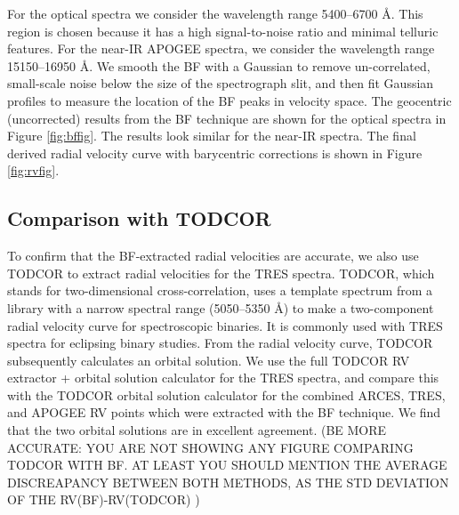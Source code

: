 For the optical spectra we consider the wavelength range 5400--6700 \AA. This region is chosen because it has a high signal-to-noise ratio and minimal telluric features. For the near-IR APOGEE spectra, we consider the wavelength range 15150--16950 \AA. We smooth the BF with a Gaussian to remove un-correlated, small-scale noise below the size of the spectrograph slit, and then fit Gaussian profiles to measure the location of the BF peaks in velocity space. The geocentric (uncorrected) results from the BF technique are shown for the optical spectra in Figure \ref{fig:bffig}. The results look similar for the near-IR spectra. The final derived radial velocity curve with barycentric corrections is shown in Figure \ref{fig:rvfig}.

\subsection{Comparison with TODCOR}\label{todcor}
To confirm that the BF-extracted radial velocities are accurate, we also use TODCOR \citep{zuc94} to extract radial velocities for the TRES spectra. TODCOR, which stands for two-dimensional cross-correlation, uses a template spectrum from a library with a narrow spectral range (5050--5350 \AA) to make a two-component radial velocity curve for spectroscopic binaries. It is commonly used with TRES spectra for eclipsing binary studies. From the radial velocity curve, TODCOR subsequently calculates an orbital solution. We use the full TODCOR RV extractor + orbital solution calculator for the TRES spectra, and compare this with the TODCOR orbital solution calculator for the combined ARCES, TRES, and APOGEE RV points which were extracted with the BF technique. We find that the two orbital solutions are in excellent agreement. (BE MORE ACCURATE: YOU ARE NOT SHOWING ANY FIGURE COMPARING TODCOR WITH BF. AT LEAST YOU SHOULD MENTION THE AVERAGE DISCREAPANCY BETWEEN BOTH METHODS, AS THE STD DEVIATION OF THE RV(BF)-RV(TODCOR) ) 

    
  
  
  